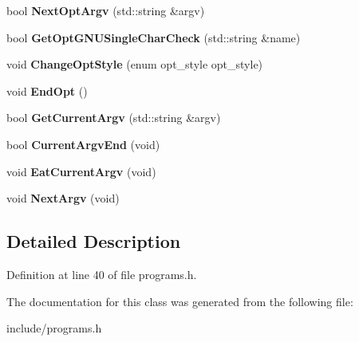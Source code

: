 \begin{DoxyCompactItemize}
\item 
\hypertarget{classCommandLine_a090151cab04fbb6e886f2053e2ef56a3}{bool {\bfseries Next\-Opt\-Argv} (std\-::string \&argv)}\label{classCommandLine_a090151cab04fbb6e886f2053e2ef56a3}

\item 
\hypertarget{classCommandLine_ac94cc029aca101fb5e39189fca40ff91}{bool {\bfseries Get\-Opt\-G\-N\-U\-Single\-Char\-Check} (std\-::string \&name)}\label{classCommandLine_ac94cc029aca101fb5e39189fca40ff91}

\item 
\hypertarget{classCommandLine_ac0f91f63b77400b7266128dbc1445b1b}{void {\bfseries Change\-Opt\-Style} (enum opt\-\_\-style opt\-\_\-style)}\label{classCommandLine_ac0f91f63b77400b7266128dbc1445b1b}

\item 
\hypertarget{classCommandLine_a941c71120faefc5e3c0876d69ac78491}{void {\bfseries End\-Opt} ()}\label{classCommandLine_a941c71120faefc5e3c0876d69ac78491}

\item 
\hypertarget{classCommandLine_a331a3c1e87e6a2c0306cf1e9f7a67945}{bool {\bfseries Get\-Current\-Argv} (std\-::string \&argv)}\label{classCommandLine_a331a3c1e87e6a2c0306cf1e9f7a67945}

\item 
\hypertarget{classCommandLine_ad457fad3218a71163a058bc095cfe0ed}{bool {\bfseries Current\-Argv\-End} (void)}\label{classCommandLine_ad457fad3218a71163a058bc095cfe0ed}

\item 
\hypertarget{classCommandLine_ab34d4cf4cb665ecb694f90e5f9c524c3}{void {\bfseries Eat\-Current\-Argv} (void)}\label{classCommandLine_ab34d4cf4cb665ecb694f90e5f9c524c3}

\item 
\hypertarget{classCommandLine_a89dd608d9095a3321d48eb90ecf210ba}{void {\bfseries Next\-Argv} (void)}\label{classCommandLine_a89dd608d9095a3321d48eb90ecf210ba}

\end{DoxyCompactItemize}


\subsection{Detailed Description}


Definition at line 40 of file programs.\-h.



The documentation for this class was generated from the following file\-:\begin{DoxyCompactItemize}
\item 
include/programs.\-h\end{DoxyCompactItemize}
